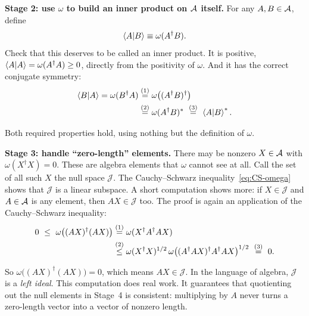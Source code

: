 \textbf{Stage 2: use $\omega$ to build an inner product on $\mathcal{A}$ itself.} For any $A,B\in\mathcal{A}$, define
\[
\braket{A|B} \equiv \omega(A^\dagger B) .
\]
Check that this deserves to be called an inner product. It is positive, $\braket{A|A}=\omega(A^\dagger A)\ge0$,
directly from the positivity of $\omega$. And it has the correct conjugate symmetry:
\begin{align}
\braket{B|A}=\omega(B^\dagger A)
&\overset{(1)}{=} \omega\big((A^\dagger B)^\dagger\big) \notag\\
&\overset{(2)}{=} \omega(A^\dagger B)^*
\ \overset{(3)}{=}\ \braket{A|B}^* . \notag
\end{align}
\quad
{}\quad
{}

Both required properties hold, using nothing but the definition of $\omega$.

\textbf{Stage 3: handle ``zero-length'' elements.} There may be nonzero $X\in\mathcal{A}$ with
$\omega(X^\dagger X)=0$. These are algebra elements that $\omega$ cannot see at all. Call the set of all such
$X$ the null space $\mathcal J$. The Cauchy--Schwarz inequality~\eqref{eq:CS-omega} shows that $\mathcal J$
is a linear subspace. A short computation shows more: if $X\in\mathcal J$ and $A\in\mathcal{A}$ is any element, then
$AX\in\mathcal J$ too. The proof is again an application of the Cauchy--Schwarz inequality:
\begin{align}
0 \ \le\ \omega\big((AX)^\dagger(AX)\big)
&\overset{(1)}{=} \omega(X^\dagger A^\dagger AX) \notag \\
&\overset{(2)}{\le} \omega(X^\dagger X)^{1/2}\,\omega\big((A^\dagger AX)^\dagger A^\dagger AX\big)^{1/2}
\ \overset{(3)}{=}\ 0 . \notag
\end{align}
\quad
{}\quad
{}

So $\omega\big((AX)^\dagger(AX)\big)=0$, which means $AX\in\mathcal J$. In the language of algebra,
$\mathcal J$ is a \emph{left ideal}. This computation does real work. It guarantees that quotienting out the
null elements in Stage~4 is consistent: multiplying by $A$ never turns a zero-length vector into a vector of
nonzero length.

